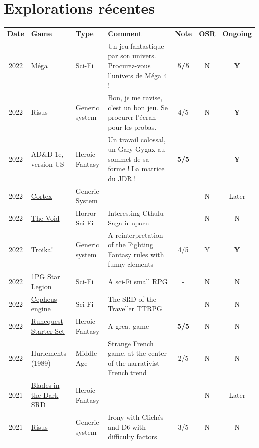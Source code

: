 \documentclass[a4paper, 11pt, twoside]{article}
\begin{document}
\section{Explorations récentes}
\label{sec:org42de0d3}

\begin{longtable}{cp{2cm}p{1.5cm}p{7cm}ccc}
\textbf{Date} & \textbf{Game} & \textbf{Type} & \textbf{Comment} & \textbf{Note} & \textbf{OSR} & \textbf{Ongoing}\\
2022 & Méga & Sci-Fi & Un jeu fantastique par son univers. Procurez-vous l'univers de Méga 4 ! & \textbf{5/5} & N & \textbf{Y}\\
2022 & Risus & Generic system & Bon, je me ravise, c'est un bon jeu. Se procurer l'écran pour les probas. & 4/5 & N & \textbf{Y}\\
2022 & AD\&D 1e, version US & Heroic Fantasy & Un travail colossal, un Gary Gygax au sommet de sa forme ! La matrice du JDR ! & \textbf{5/5} & - & \textbf{Y}\\
2022 & \href{https://www.cortexrpg.com/compendium/explore-the-rules/}{Cortex} & Generic System &  & - & N & Later\\
2022 & \href{https://www.drivethrurpg.com/product/117563}{The Void} & Horror Sci-Fi & Interesting Cthulu Saga in space & - & N & N\\
2022 & Troika! & Generic system & A reinterpretation of the \href{https://github.com/orey/jdr/tree/master/FightingFantasys-fr}{Fighting Fantasy} rules with funny elements & 4/5 & Y & \textbf{Y}\\
2022 & 1PG Star Legion & Sci-Fi & A sci-Fi small RPG & - & N & N\\
2022 & \href{https://www.drivethrurpg.com/product/186894/Cepheus-Engine-System-Reference-Document}{Cepheus engine} & Sci-Fi & The SRD of the Traveller TTRPG & - & N & N\\
2022 & \href{https://www.chaosium.com/runequest-starter-set/}{Runequest Starter Set} & Heroic Fantasy & A great game & \textbf{5/5} & N & N\\
2022 & Hurlements (1989) & Middle-Age & Strange French game, at the center of the narrativist French trend & 2/5 & N & N\\
2021 & \href{https://github.com/orey/jdr/tree/master/BladesInTheDark-SRD}{Blades in the Dark SRD} & Heroic Fantasy &  & - & N & Later\\
2021 & \href{https://github.com/orey/jdr/tree/master/Risus-fr}{Risus} & Generic system & Irony with Clichés and D6 with difficulty factors & 3/5 & N & N\\

\end{longtable}
\end{document}
